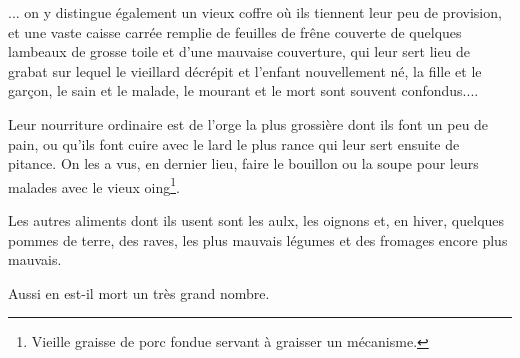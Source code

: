 {... on y distingue également un vieux coffre où ils tiennent leur peu de provision, et une vaste caisse carrée remplie de feuilles de frêne couverte de quelques lambeaux de grosse toile et d’une mauvaise couverture, qui leur sert lieu de grabat sur lequel le vieillard décrépit et l’enfant nouvellement né, la fille et le garçon, le sain et le malade, le mourant et le mort sont souvent confondus....

Leur nourriture ordinaire est de l’orge la plus grossière dont ils font un peu de pain, ou qu’ils font cuire avec le lard le plus rance qui leur sert ensuite de pitance. On les a vus, en dernier lieu, faire le bouillon ou la soupe pour leurs malades avec le vieux oing\footnote{Vieille graisse de porc fondue servant à graisser un mécanisme.}.

Les autres aliments dont ils usent sont les aulx, les oignons et, en hiver, quelques pommes de terre, des raves, les plus mauvais légumes et des fromages encore plus mauvais.

Aussi en est-il mort un très grand nombre.

}

